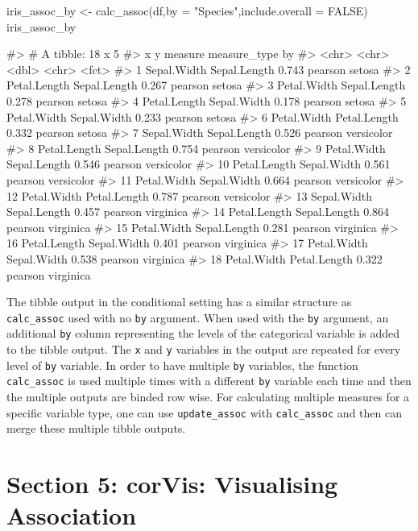 \begin{Schunk}
\begin{Sinput}
iris_assoc_by <- calc_assoc(df,by = "Species",include.overall = FALSE)
iris_assoc_by
\end{Sinput}
\begin{Soutput}
#> # A tibble: 18 x 5
#>    x            y            measure measure_type by        
#>    <chr>        <chr>          <dbl> <chr>        <fct>     
#>  1 Sepal.Width  Sepal.Length   0.743 pearson      setosa    
#>  2 Petal.Length Sepal.Length   0.267 pearson      setosa    
#>  3 Petal.Width  Sepal.Length   0.278 pearson      setosa    
#>  4 Petal.Length Sepal.Width    0.178 pearson      setosa    
#>  5 Petal.Width  Sepal.Width    0.233 pearson      setosa    
#>  6 Petal.Width  Petal.Length   0.332 pearson      setosa    
#>  7 Sepal.Width  Sepal.Length   0.526 pearson      versicolor
#>  8 Petal.Length Sepal.Length   0.754 pearson      versicolor
#>  9 Petal.Width  Sepal.Length   0.546 pearson      versicolor
#> 10 Petal.Length Sepal.Width    0.561 pearson      versicolor
#> 11 Petal.Width  Sepal.Width    0.664 pearson      versicolor
#> 12 Petal.Width  Petal.Length   0.787 pearson      versicolor
#> 13 Sepal.Width  Sepal.Length   0.457 pearson      virginica 
#> 14 Petal.Length Sepal.Length   0.864 pearson      virginica 
#> 15 Petal.Width  Sepal.Length   0.281 pearson      virginica 
#> 16 Petal.Length Sepal.Width    0.401 pearson      virginica 
#> 17 Petal.Width  Sepal.Width    0.538 pearson      virginica 
#> 18 Petal.Width  Petal.Length   0.322 pearson      virginica
\end{Soutput}
\end{Schunk}

The tibble output in the conditional setting has a similar structure as
\texttt{calc\_assoc} used with no \texttt{by} argument. When used with
the \texttt{by} argument, an additional \texttt{by} column representing
the levels of the categorical variable is added to the tibble output.
The \texttt{x} and \texttt{y} variables in the output are repeated for
every level of \texttt{by} variable. In order to have multiple
\texttt{by} variables, the function \texttt{calc\_assoc} is used
multiple times with a different \texttt{by} variable each time and then
the multiple outputs are binded row wise. For calculating multiple
measures for a specific variable type, one can use
\texttt{update\_assoc} with \texttt{calc\_assoc} and then can merge
these multiple tibble outputs.

\hypertarget{section-5-corvis-visualising-association}{%
\section{Section 5: corVis: Visualising
Association}\label{section-5-corvis-visualising-association}}

